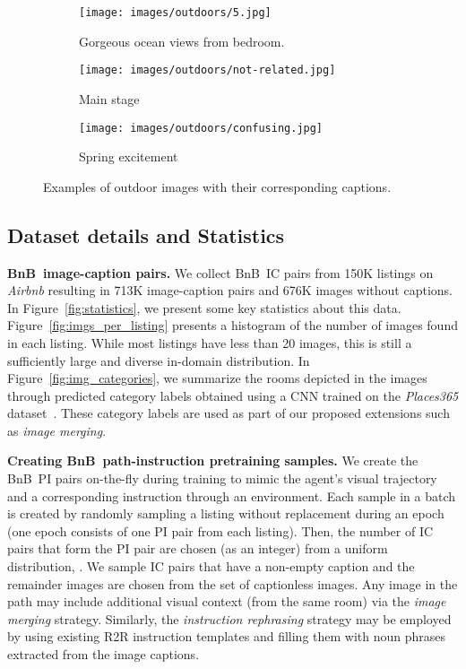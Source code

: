 \RequirePackage[dvipsnames,table]{xcolor} \documentclass[10pt,twocolumn,letterpaper]{article}
\newcommand{\p}[1]{\vspace{1mm}\noindent\textbf{#1}}
\newcommand{\airbnb}{BnB}
\begin{document}
\begin{figure*}[t]
\centering
\begin{subfigure}[b]{0.30\textwidth}
\centering 
\texttt{[image: images/outdoors/5.jpg]}
\caption{Gorgeous ocean views from {\color{red}bedroom}.}
\label{fig:view}
\end{subfigure}\quad
\begin{subfigure}[b]{0.339\textwidth}
\centering 
\texttt{[image: images/outdoors/not-related.jpg]}
\caption{Main stage}
\label{fig:festival}
\end{subfigure}\quad
\begin{subfigure}[b]{0.30\textwidth}
\centering 
\texttt{[image: images/outdoors/confusing.jpg]}
\caption{Spring excitement}
\label{fig:confusing}
\end{subfigure}
\caption{Examples of outdoor images with their corresponding captions.}
\label{fig:outdoor}
\end{figure*}



\subsection{Dataset details and Statistics}

\p{\airbnb~image-caption pairs.}
We collect \airbnb~IC pairs from 150K listings on \emph{Airbnb} resulting in 713K image-caption pairs and 676K images without captions.
In Figure~\ref{fig:statistics}, we present some key statistics about this data.
Figure~\ref{fig:imgs_per_listing} presents a histogram of the number of images found in each listing.
While most listings have less than 20 images, this is still a sufficiently large and diverse in-domain distribution.
In Figure~\ref{fig:img_categories}, we summarize the rooms depicted in the images through predicted category labels obtained using a CNN trained on the \emph{Places365} dataset~\cite{zhou2017places}.
These category labels are used as part of our proposed extensions such as \emph{image merging}.


\p{Creating \airbnb~path-instruction pretraining samples.}
We create the \airbnb~PI pairs on-the-fly during training to mimic the agent's visual trajectory and a corresponding instruction through an environment.
Each sample in a batch is created by randomly sampling a listing without replacement during an epoch (one epoch consists of one PI pair from each listing).
Then, the number of IC pairs  that form the PI pair are chosen (as an integer) from a uniform distribution, .
We sample  IC pairs that have a non-empty caption and the remainder  images are chosen from the set of captionless images.
Any image in the path may include additional visual context (from the same room) via the \emph{image merging} strategy.
Similarly, the \emph{instruction rephrasing} strategy may be employed by using existing R2R instruction templates and filling them with noun phrases extracted from the image captions.
\end{document}

